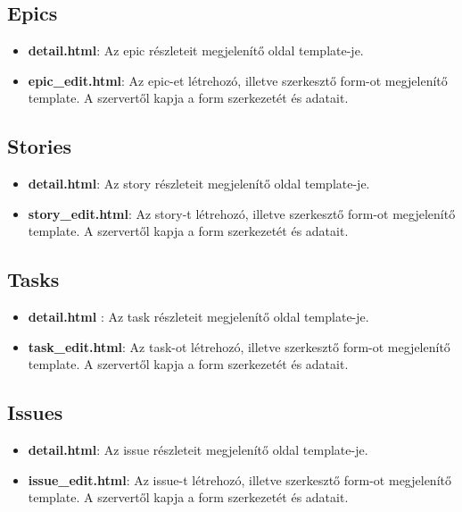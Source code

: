 \subsection{Epics}
\begin{itemize}
	\item \textbf{detail.html}: Az epic részleteit megjelenítő oldal template-je.
	\item \textbf{epic\_edit.html}: Az epic-et létrehozó, illetve szerkesztő form-ot megjelenítő template. A szervertől kapja a form szerkezetét és adatait.
\end{itemize}
\subsection{Stories}
\begin{itemize}
	\item \textbf{detail.html}: Az story részleteit megjelenítő oldal template-je.
	\item \textbf{story\_edit.html}: Az story-t létrehozó, illetve szerkesztő form-ot megjelenítő template. A szervertől kapja a form szerkezetét és adatait.
\end{itemize}
\subsection{Tasks}
\begin{itemize}
	\item \textbf{detail.html} : Az task részleteit megjelenítő oldal template-je.
	\item \textbf{task\_edit.html}: Az task-ot létrehozó, illetve szerkesztő form-ot megjelenítő template. A szervertől kapja a form szerkezetét és adatait.
\end{itemize}
\subsection{Issues}
\begin{itemize}
	\item \textbf{detail.html}: Az issue részleteit megjelenítő oldal template-je.
	\item \textbf{issue\_edit.html}: Az issue-t létrehozó, illetve szerkesztő form-ot megjelenítő template. A szervertől kapja a form szerkezetét és adatait.
\end{itemize}
